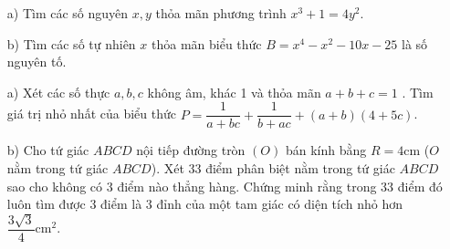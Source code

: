 \begin{ex}%
\hfill
\begin{enumerate}
\item[a)] Tìm các số nguyên $x,y$ thỏa mãn phương trình $x^3+1=4y^2$.
\item[b)]  Tìm các số tự nhiên $x$ thỏa mãn biểu thức $B=x^4-x^2-10x-25$ là số nguyên tố.
\end{enumerate}
\end{ex}
\begin{ex}%
\hfill
\begin{enumerate}
\item[a)] Xét các số thực $a,b,c$ không âm, khác 1 và thỏa mãn $a+b+c=1$ . Tìm giá trị nhỏ nhất của biểu thức
$P=\dfrac{1}{a+bc}+\dfrac{1}{b+ac}+(a+b)(4+5c)$. 
\item[b)] Cho tứ giác $ABCD$ nội tiếp đường tròn $(O)$ bán kính bằng $R=4 \mathrm{cm}$ ($O$ nằm trong tứ giác $ABCD$). Xét $33$ điểm phân biệt nằm trong tứ giác $ABCD$ sao cho không có $3$ điểm nào thẳng hàng. Chứng minh rằng trong 33 điểm đó luôn tìm được $3$ điểm là $3$ đỉnh của một tam giác có diện tích nhỏ hơn $\dfrac{3\sqrt{3}}{4}\mathrm{cm}^2$.
\end{enumerate}
\end{ex}
